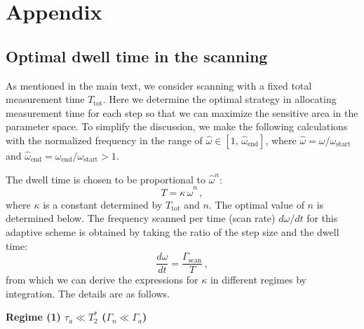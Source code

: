 \section{Appendix}


\subsection{Optimal dwell time in the scanning}

As mentioned in the main text, we consider scanning with a fixed total measurement time $T_{\mathrm{tot}}$. 
Here we determine the optimal strategy in allocating measurement time for each step so that we can maximize the sensitive area in the parameter space. To simplify the discussion, we make the following calculations with the normalized frequency in the range of $\hat{\omega}\in [1,\,\hat{\omega}_{\mathrm{end}}]$, where $\hat{\omega}=\omega/\omega_{\mathrm{start}}$ and $\hat{\omega}_{\mathrm{end}}=\omega_{\mathrm{end}}/\omega_{\mathrm{start}}>1$. %

The dwell time is chosen to be proportional to $\hat{\omega}^n$:
\begin{equation}
    T = \kappa\, \hat{\omega}^n
    \,,\label{eq:T_kappa_omega_n}
\end{equation}
where $\kappa$ is a constant determined by $T_{\mathrm{tot}}$ and $n$. The optimal value of $n$ is determined below. 
The frequency scanned per time (scan rate) $d\omega/dt$ for this adaptive scheme is obtained by taking the ratio of the step size and the dwell time: 
\begin{equation}
    \dfrac{d\omega}{dt} = \dfrac{\Gamma_{\mathrm{scan}}}{T}
    \,,\label{eq:domega_dt}
\end{equation}
from which we can derive the expressions for $\kappa$ in different regimes by integration. 
The details are as follows. 


\textbf{Regime (1) $\tau_a \ll T_2^*$ ($\Gamma_n\ll\Gamma_a$)}

